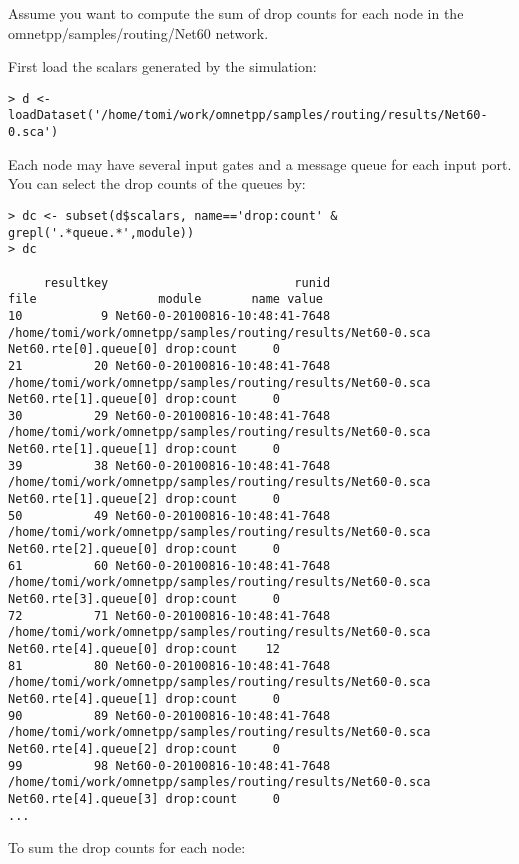 Assume you want to compute the sum of drop counts for each node in the
omnetpp/samples/routing/Net60 network.

First load the scalars generated by the simulation:

\begin{verbatim}
> d <- loadDataset('/home/tomi/work/omnetpp/samples/routing/results/Net60-0.sca')
\end{verbatim}

Each node may have several input gates and a message queue for each input port.
You can select the drop counts of the queues by:

\begin{verbatim}
> dc <- subset(d$scalars, name=='drop:count' & grepl('.*queue.*',module))
> dc

     resultkey                          runid                                                        file                 module       name value
10           9 Net60-0-20100816-10:48:41-7648 /home/tomi/work/omnetpp/samples/routing/results/Net60-0.sca  Net60.rte[0].queue[0] drop:count     0
21          20 Net60-0-20100816-10:48:41-7648 /home/tomi/work/omnetpp/samples/routing/results/Net60-0.sca  Net60.rte[1].queue[0] drop:count     0
30          29 Net60-0-20100816-10:48:41-7648 /home/tomi/work/omnetpp/samples/routing/results/Net60-0.sca  Net60.rte[1].queue[1] drop:count     0
39          38 Net60-0-20100816-10:48:41-7648 /home/tomi/work/omnetpp/samples/routing/results/Net60-0.sca  Net60.rte[1].queue[2] drop:count     0
50          49 Net60-0-20100816-10:48:41-7648 /home/tomi/work/omnetpp/samples/routing/results/Net60-0.sca  Net60.rte[2].queue[0] drop:count     0
61          60 Net60-0-20100816-10:48:41-7648 /home/tomi/work/omnetpp/samples/routing/results/Net60-0.sca  Net60.rte[3].queue[0] drop:count     0
72          71 Net60-0-20100816-10:48:41-7648 /home/tomi/work/omnetpp/samples/routing/results/Net60-0.sca  Net60.rte[4].queue[0] drop:count    12
81          80 Net60-0-20100816-10:48:41-7648 /home/tomi/work/omnetpp/samples/routing/results/Net60-0.sca  Net60.rte[4].queue[1] drop:count     0
90          89 Net60-0-20100816-10:48:41-7648 /home/tomi/work/omnetpp/samples/routing/results/Net60-0.sca  Net60.rte[4].queue[2] drop:count     0
99          98 Net60-0-20100816-10:48:41-7648 /home/tomi/work/omnetpp/samples/routing/results/Net60-0.sca  Net60.rte[4].queue[3] drop:count     0
...
\end{verbatim}

To sum the drop counts for each node:

